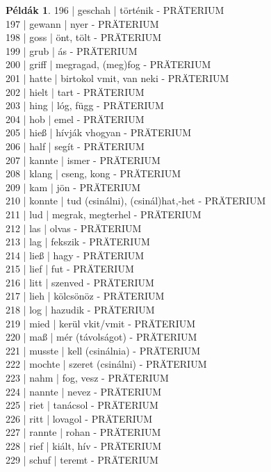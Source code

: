 \documentclass{article}
\theoremstyle{definition}
\newtheorem*{exmp}{Példák}
\begin{document}
\begin{exmp}
196 | geschah | történik - PRÄTERIUM\\
197 | gewann | nyer - PRÄTERIUM\\
198 | goss | önt, tölt - PRÄTERIUM\\
199 | grub | ás - PRÄTERIUM\\
200 | griff | megragad, (meg)fog - PRÄTERIUM\\
201 | hatte | birtokol vmit, van neki - PRÄTERIUM\\
202 | hielt | tart - PRÄTERIUM\\
203 | hing | lóg, függ - PRÄTERIUM\\
204 | hob | emel - PRÄTERIUM\\
205 | hieß | hívják vhogyan - PRÄTERIUM\\
206 | half | segít - PRÄTERIUM\\
207 | kannte | ismer - PRÄTERIUM\\
208 | klang | cseng, kong - PRÄTERIUM\\
209 | kam | jön - PRÄTERIUM\\
210 | konnte | tud (csinálni), (csinál)hat,-het - PRÄTERIUM\\
211 | lud | megrak, megterhel  - PRÄTERIUM\\
212 | las | olvas - PRÄTERIUM\\
213 | lag | fekszik - PRÄTERIUM\\
214 | ließ | hagy - PRÄTERIUM\\
215 | lief | fut - PRÄTERIUM\\
216 | litt | szenved - PRÄTERIUM\\
217 | lieh | kölcsönöz - PRÄTERIUM\\
218 | log | hazudik - PRÄTERIUM\\
219 | mied | kerül vkit/vmit - PRÄTERIUM\\
220 | maß | mér (távolságot) - PRÄTERIUM\\
221 | musste | kell (csinálnia) - PRÄTERIUM\\
222 | mochte | szeret (csinálni) - PRÄTERIUM\\
223 | nahm | fog, vesz - PRÄTERIUM\\
224 | nannte | nevez - PRÄTERIUM\\
225 | riet | tanácsol - PRÄTERIUM\\
226 | ritt | lovagol - PRÄTERIUM\\
227 | rannte  | rohan - PRÄTERIUM\\
228 | rief | kiált, hív - PRÄTERIUM\\
229 | schuf | teremt - PRÄTERIUM\\

\end{exmp}
\end{document}

